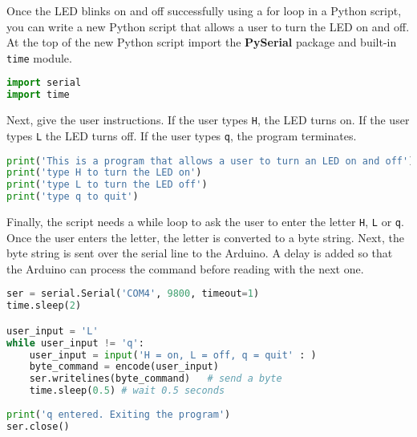 \documentclass{book}
\newcommand{\passthrough}[1]{#1}
\begin{document}
    
        Once the LED blinks on and off successfully using a for loop in a Python
script, you can write a new Python script that allows a user to turn the
LED on and off. At the top of the new Python script import the
\textbf{PySerial} package and built-in \passthrough{\lstinline!time!}
module.
    




    
        \begin{lstlisting}[language=Python]
import serial
import time
\end{lstlisting}
    




    
        Next, give the user instructions. If the user types
\passthrough{\lstinline!H!}, the LED turns on. If the user types
\passthrough{\lstinline!L!} the LED turns off. If the user types
\passthrough{\lstinline!q!}, the program terminates.
    




    
        \begin{lstlisting}[language=Python]
print('This is a program that allows a user to turn an LED on and off')
print('type H to turn the LED on')
print('type L to turn the LED off')
print('type q to quit')
\end{lstlisting}
    




    
        Finally, the script needs a while loop to ask the user to enter the
letter \passthrough{\lstinline!H!}, \passthrough{\lstinline!L!} or
\passthrough{\lstinline!q!}. Once the user enters the letter, the letter
is converted to a byte string. Next, the byte string is sent over the
serial line to the Arduino. A delay is added so that the Arduino can
process the command before reading with the next one.
    




    
        \begin{lstlisting}[language=Python]
ser = serial.Serial('COM4', 9800, timeout=1)
time.sleep(2)

user_input = 'L'
while user_input != 'q':
    user_input = input('H = on, L = off, q = quit' : )
    byte_command = encode(user_input)
    ser.writelines(byte_command)   # send a byte
    time.sleep(0.5) # wait 0.5 seconds
        
print('q entered. Exiting the program')
ser.close()
\end{lstlisting}
    
\end{document}
